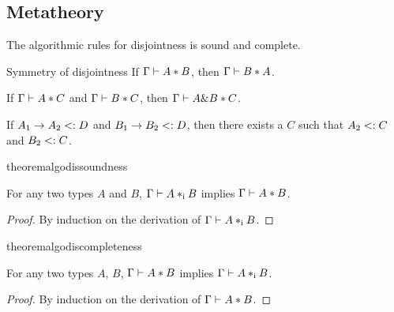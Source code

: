 \begin{figure*}[h]


  \caption{Algorithmic Disjointness.}
  \label{fig:disjointness}
\end{figure*}

\subsection{Metatheory}

The algorithmic rules for disjointness is sound and complete.

\begin{lemma}{Symmetry of disjointness} \label{lemma:symmetry-of-disjointness}
  If $\Gamma \vdash A * B$, then $\Gamma \vdash B * A$.
\end{lemma}

\begin{theorem} \label{lemma:disjoint-intersect}
  If $\Gamma \vdash A * C$ and $\Gamma \vdash B * C$,
  then $\Gamma \vdash A \& B * C$.
\end{theorem}

\begin{lemma} \label{lemma:common-supertype}
  If $A_1 \to A_2 <: D$ and $B_1 \to B_2 <: D$,
  then there exists a $C$ such that $A_2 <: C$ and $B_2 <: C$.
\end{lemma}

\begin{restatable}{theorem}{algodissoundness}
  \label{theorem:soundness}

  For any two types $A$ and $B$, $\Gamma \vdash A *_\textnormal{i} B$ implies $\Gamma \vdash A * B$.
\end{restatable}

\begin{proof}
  By induction on the derivation of $\Gamma \vdash A *_\textnormal{i} B$.
\end{proof}

\begin{restatable}{theorem}{algodiscompleteness}
  \label{theorem:completeness}

  For any two types $A$, $B$, $\Gamma \vdash A * B$ implies $\Gamma \vdash A *_\textnormal{i} B$.
\end{restatable}

\begin{proof}
  By induction on the derivation of $\Gamma \vdash A * B$.
\end{proof}
